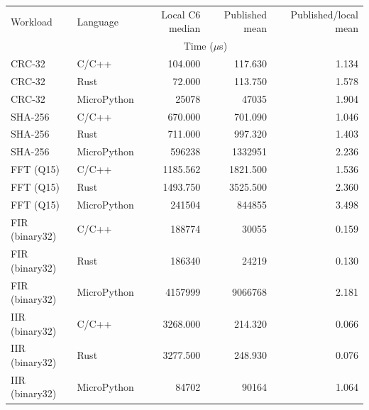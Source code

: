 \begin{longtable}{@{}llrrr@{}}
\toprule
Workload & Language & Local C6 median & Published mean & Published/local mean \\
 & & \multicolumn{2}{c}{Time (\(\mu\)s)} & \\
\midrule
\endhead
CRC-32 & C/C++ & 104.000 & 117.630 & 1.134 \\
CRC-32 & Rust & 72.000 & 113.750 & 1.578 \\
CRC-32 & MicroPython & 25078 & 47035 & 1.904 \\
SHA-256 & C/C++ & 670.000 & 701.090 & 1.046 \\
SHA-256 & Rust & 711.000 & 997.320 & 1.403 \\
SHA-256 & MicroPython & 596238 & 1332951 & 2.236 \\
FFT (Q15) & C/C++ & 1185.562 & 1821.500 & 1.536 \\
FFT (Q15) & Rust & 1493.750 & 3525.500 & 2.360 \\
FFT (Q15) & MicroPython & 241504 & 844855 & 3.498 \\
FIR (binary32) & C/C++ & 188774 & 30055 & 0.159 \\
FIR (binary32) & Rust & 186340 & 24219 & 0.130 \\
FIR (binary32) & MicroPython & 4157999 & 9066768 & 2.181 \\
IIR (binary32) & C/C++ & 3268.000 & 214.320 & 0.066 \\
IIR (binary32) & Rust & 3277.500 & 248.930 & 0.076 \\
IIR (binary32) & MicroPython & 84702 & 90164 & 1.064 \\
\bottomrule
\end{longtable}
